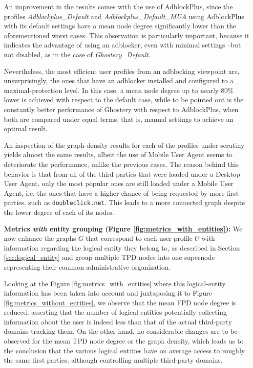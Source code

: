 \documentclass{sig-alternate}
\begin{document}
An improvement in the results comes with the use of AdblockPlus, since the profiles \textit{Adblockplus\_Default} and \textit{Adblockplus\_Default\_MUA} using AdblockPlus with its default settings have a mean node degree significantly lower than the aforementioned worst cases. This observation is particularly important, because it indicates the advantage of using an adblocker, even with minimal settings --but not disabled, as in the case of \textit{Ghostery\_Default}.

Nevertheless, the most efficient user profiles from an adblocking viewpoint are, unsurprisingly, the ones that have an adblocker installed and configured to a maximal-protection level. In this case, a mean node degree up to nearly 80\% lower is achieved with respect to the default case, while to be pointed out is the constantly better performance of Ghostery with respect to AdblockPlus, when both are compared under equal terms, that is, manual settings to achieve an optimal result.

An inspection of the graph-density results for each of the profiles under scrutiny yields almost the same results, albeit the use of Mobile User Agent seems to deteriorate the performance, unlike the previous cases. The reason behind this behavior is that from all of the third parties that were loaded under a Desktop User Agent, only the most popular ones are still loaded under a Mobile User Agent, i.e. the ones that have a higher chance of being requested by more first parties, such as \texttt{doubleclick.net}. This leads to a more connected graph despite the lower degree of each of its nodes.

\textbf{Metrics \textit{with} entity grouping (Figure \ref{fig:metrics_with_entities}):} We now enhance the graphs $G$ that correspond to each user profile $U$ with information regarding the logical entity they belong to, as described in Section \ref{sec:logical_entity} and group multiple TPD nodes into one supernode representing their common administrative organization.

Looking at the Figure \ref{fig:metrics_with_entities} where this logical-entity information has been taken into account and juxtaposing it to Figure \ref{fig:metrics_without_entities}, we observe that the mean FPD node degree is reduced, asserting that the number of logical entities potentially collecting information about the user is indeed less than that of the actual third-party domains tracking them. On the other hand, no considerable changes are to be observed for the mean TPD node degree or the graph density, which leads us to the conclusion that the various logical entities have on average access to roughly the same first parties, although controlling multiple third-party domains.
\end{document}
